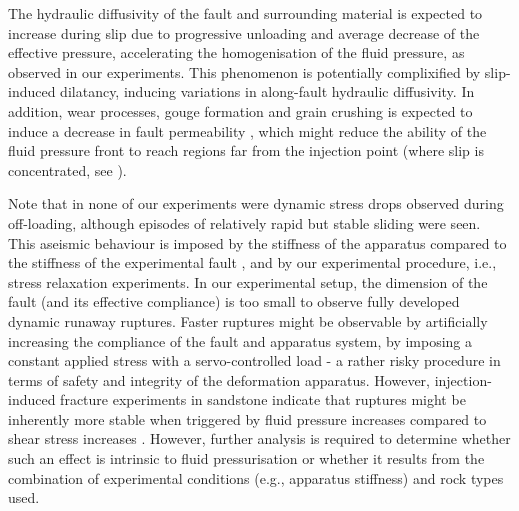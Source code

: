 \documentclass[grl]{agutex2arxiv}
\begin{document}
\begin{article}
The hydraulic diffusivity of the fault and surrounding material is expected to increase during slip due to progressive unloading and average decrease of the effective pressure, accelerating the homogenisation of the fluid pressure, as observed in our experiments. This phenomenon is potentially complixified by slip-induced dilatancy, inducing variations in along-fault hydraulic diffusivity. In addition, wear processes, gouge formation and grain crushing is expected to induce a decrease in fault permeability \citep[e.g.,][]{Olsson1993,Zhang1998,Rutter2017}, which might reduce the ability of the fluid pressure front to reach regions far from the injection point (where slip is concentrated, see \cite{Garagash2012}).

% 

 
Note that in none of our experiments were dynamic stress drops observed during off-loading, although episodes of relatively rapid but stable sliding were seen. This aseismic behaviour is imposed by the stiffness of the apparatus compared to the stiffness of the experimental fault \citep[e.g.,][]{Leeman2016}, and by our experimental procedure, i.e., stress relaxation experiments. In our experimental setup, the dimension of the fault (and its effective compliance) is too small to observe fully developed dynamic runaway ruptures. Faster ruptures might be observable by artificially increasing the compliance of the fault and apparatus system, by imposing a constant applied stress with a servo-controlled load - a rather risky procedure in terms of safety and integrity of the deformation apparatus. However, injection-induced fracture experiments in sandstone indicate that ruptures might be inherently more stable when triggered by fluid pressure increases compared to shear stress increases \citep[e.g.,][]{Ougier2013,Ougier2015,French2016}. %
However, further analysis is required to determine whether such an effect is intrinsic to fluid pressurisation or whether it results from the combination of experimental conditions (e.g., apparatus stiffness) and rock types used.





\end{article}
\end{document}
